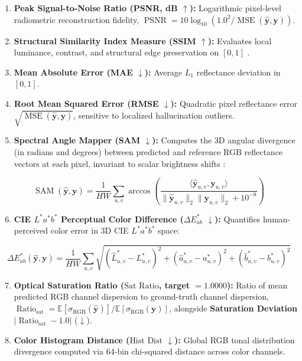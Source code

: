 \documentclass[10pt,a4paper,twoside]{article}
\begin{document}
\begin{enumerate}
    \item \textbf{Peak Signal-to-Noise Ratio (PSNR, dB $\uparrow$):} Logarithmic pixel-level radiometric reconstruction fidelity, $\operatorname{PSNR} = 10\log_{10}\!\left(1.0^2 / \operatorname{MSE}(\hat{\mathbf{y}}, \mathbf{y})\right)$.
    \item \textbf{Structural Similarity Index Measure (SSIM $\uparrow$):} Evaluates local luminance, contrast, and structural edge preservation on $[0, 1]$ \cite{ref24}.
    \item \textbf{Mean Absolute Error (MAE $\downarrow$):} Average $L_1$ reflectance deviation in $[0, 1]$.
    \item \textbf{Root Mean Squared Error (RMSE $\downarrow$):} Quadratic pixel reflectance error $\sqrt{\operatorname{MSE}(\hat{\mathbf{y}}, \mathbf{y})}$, sensitive to localized hallucination outliers.
    \item \textbf{Spectral Angle Mapper (SAM $\downarrow$):} Computes the 3D angular divergence (in radians and degrees) between predicted and reference RGB reflectance vectors at each pixel, invariant to scalar brightness shifts \cite{ref27}:
\end{enumerate}

\begin{equation}
    \operatorname{SAM}(\hat{\mathbf{y}}, \mathbf{y}) = \frac{1}{HW}\sum_{u,v}\arccos\!\left( \frac{\langle \hat{\mathbf{y}}_{u,v}, \mathbf{y}_{u,v}\rangle}{\|\hat{\mathbf{y}}_{u,v}\|_2 \|\mathbf{y}_{u,v}\|_2 + 10^{-8}} \right)
    \label{eq:sam}
\end{equation}

\begin{enumerate}
    \setcounter{enumi}{5}
    \item \textbf{CIE $L^*a^*b^*$ Perceptual Color Difference ($\Delta E^*_{ab}$ $\downarrow$):} Quantifies human-perceived color error in 3D CIE $L^*a^*b^*$ space:
\end{enumerate}

\begin{equation}
    \Delta E^*_{ab}(\hat{\mathbf{y}}, \mathbf{y}) = \frac{1}{HW}\sum_{u,v}\sqrt{(\hat{L}^*_{u,v} - L^*_{u,v})^2 + (\hat{a}^*_{u,v} - a^*_{u,v})^2 + (\hat{b}^*_{u,v} - b^*_{u,v})^2}
    \label{eq:delta_e}
\end{equation}

\begin{enumerate}
    \setcounter{enumi}{6}
    \item \textbf{Optical Saturation Ratio ($\text{Sat Ratio}$, target $= 1.0000$):} Ratio of mean predicted RGB channel dispersion to ground-truth channel dispersion, $\operatorname{Ratio}_{\mathrm{sat}} = \mathbb{E}[\sigma_{\mathrm{RGB}}(\hat{\mathbf{y}})] / \mathbb{E}[\sigma_{\mathrm{RGB}}(\mathbf{y})]$, alongside \textbf{Saturation Deviation} $|\operatorname{Ratio}_{\mathrm{sat}} - 1.0|$ ($\downarrow$).
    \item \textbf{Color Histogram Distance ($\text{Hist Dist}$ $\downarrow$):} Global RGB tonal distribution divergence computed via 64-bin chi-squared distance across color channels.
\end{enumerate}
\end{document}
